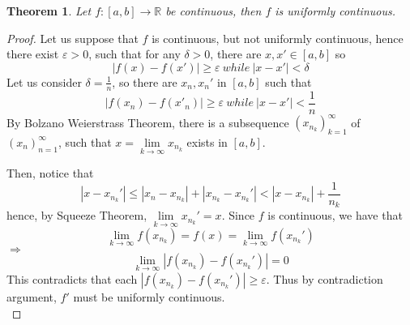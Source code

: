 \documentclass[12pt]{article}
\theoremstyle{plain}
\newtheorem{theorem}{Theorem}[subsection]
\newcommand{\abs}[1]{\left| #1 \right|}
\newcommand{\ep}{\varepsilon}
\newcommand{\dlim}{\displaystyle\lim\limits}
\begin{document}
	\begin{theorem}
		Let $f:[a,b]\to \mathbb{R}$ be continuous, 
		then  $f$ is uniformly continuous. 
	\end{theorem}
	\begin{proof}
		Let us suppose that $f$ is continuous, but not uniformly continuous,
		hence there exist $\ep>0$, such that for any $\delta>0$, 
		there are $x, x' \in [a,b]$ so 
		\[
			\abs{f(x)-f(x')}\geq \ep \ while \ \abs{x-x'} < \delta
		\]
		Let us consider $\delta = \frac 1n$, so there are $x_n, x_n'$ in $[a,b]$
		such that 
		\[
			\abs{f(x_n)-f(x'_n)}\geq \ep \ while \ \abs{x-x'} < \frac 1n
		\]
		By Bolzano Weierstrass Theorem, there is a subsequence
		$(x_{n_k})_{k=1}^{\infty}$ of $(x_n)_{n=1}^{\infty}$, such that 
		$x=\dlim_{k\to\infty} x_{n_k}$ exists in $[a,b]$. 

		Then, notice that 
		\[
			\abs{x-x_{n_k}'} \leq \abs{x_n-x_{n_k}}+\abs{x_{n_k}-x_{n_k}'}
			<\abs{x-x_{n_k}}+\frac 1{n_k} 
		\]
		hence, by Squeeze Theorem, $\dlim_{k\to\infty} x_{n_k}'=x$. 
		Since $f$ is continuous, we have that 
		\[
			\lim_{k\to\infty} f(x_{n_k}) = f(x) = \lim_{k\to\infty}f(x_{n_k}')
		\]
		$\Rightarrow$
		\[
			\lim_{k\to\infty} \abs{f(x_{n_k})-f(x_{n_k}')}=0
		\]
		This contradicts that each $\abs{f(x_{n_k})-f(x_{n_k}')}\geq \ep$. 
		Thus by contradiction argument, $f'$ must be uniformly continuous. \\
	\end{proof}
	
\end{document}
